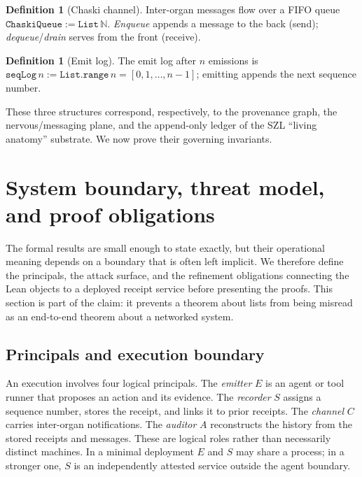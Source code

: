 \documentclass[11pt,letterpaper]{article}
\theoremstyle{definition}
\newtheorem{definition}[theorem]{Definition}
\begin{document}
\begin{definition}[Chaski channel]
Inter-organ messages flow over a FIFO queue $\texttt{ChaskiQueue} :=
\texttt{List}\,\mathbb{N}$. \emph{Enqueue} appends a message to the back (send);
\emph{dequeue}/\emph{drain} serves from the front (receive).
\end{definition}

\begin{definition}[Emit log]
The emit log after $n$ emissions is $\texttt{seqLog}\,n := \texttt{List.range}\,n
= [0,1,\dots,n-1]$; emitting appends the next sequence number.
\end{definition}

These three structures correspond, respectively, to the provenance graph, the
nervous/messaging plane, and the append-only ledger of the SZL ``living
anatomy'' substrate. We now prove their governing invariants.

\section{System boundary, threat model, and proof obligations}
\label{sec:threat}

The formal results are small enough to state exactly, but their operational
meaning depends on a boundary that is often left implicit. We therefore define
the principals, the attack surface, and the refinement obligations connecting
the Lean objects to a deployed receipt service before presenting the proofs.
This section is part of the claim: it prevents a theorem about lists from being
misread as an end-to-end theorem about a networked system.

\subsection{Principals and execution boundary}

An execution involves four logical principals. The \emph{emitter} $E$ is an
agent or tool runner that proposes an action and its evidence. The
\emph{recorder} $S$ assigns a sequence number, stores the receipt, and links it
to prior receipts. The \emph{channel} $C$ carries inter-organ notifications.
The \emph{auditor} $A$ reconstructs the history from the stored receipts and
messages. These are logical roles rather than necessarily distinct machines.
In a minimal deployment $E$ and $S$ may share a process; in a stronger one, $S$
is an independently attested service outside the agent boundary.
\end{document}
